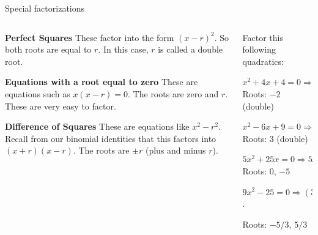 \documentclass[9pt,aspectratio=169]{beamer}
\begin{document}
\begin{frame}{Special factorizations}
  \begin{columns}[T]
    \begin{column}{0.45\textwidth}
      \textbf{Perfect Squares}
      These factor into the form $(x - r)^2$.  So both roots are equal to $r$.  In this case, $r$ is called a double root.
      
      \medskip
      \textbf{Equations with a root equal to zero}
      These are equations such as $x(x - r) = 0$.  The roots are zero and $r$.  These are very easy to factor.

      \medskip
      \textbf{Difference of Squares}
      These are equations like $x^2 - r^2$.  Recall from our binomial identities that this factors into $(x + r)(x - r)$.  The roots are $\pm r$ (plus and minus $r$).
    \end{column}
    \begin{column}{0.55\textwidth}
      Factor this following quadratics:

      $x^2 + 4x + 4 = 0  \Rightarrow (x + 2)^2 = 0.$  Roots: $-2$ (double)

      $x^2 - 6x + 9 = 0  \Rightarrow (x - 3)^2 = 0.$	Roots: $3$ (double)
      \medskip

      $5x^2 + 25x = 0 \Rightarrow 5x(x + 5) = 0.$  Roots: $0$, $-5$
      \bigskip
      \bigskip
      \bigskip
      \smallskip

      $9x^2 - 25 = 0 \Rightarrow (3x + 5)(3x - 5) = 0$.  
      
      Roots: $-5/3$, $5/3$
    \end{column}
  \end{columns}
\end{frame}
\end{document}
